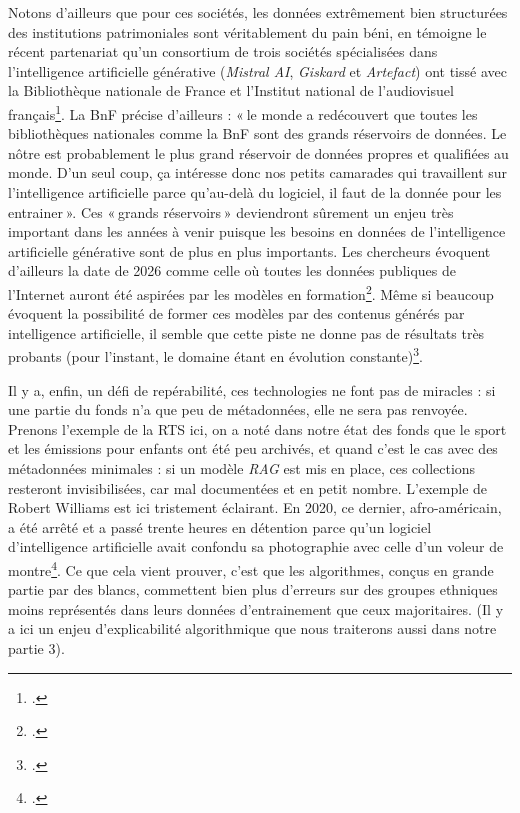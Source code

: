 Notons d’ailleurs que pour ces sociétés, les données extrêmement bien structurées des institutions patrimoniales sont véritablement du pain béni, en témoigne le récent partenariat qu’un consortium de trois sociétés spécialisées dans l’intelligence artificielle générative (\textit{Mistral AI}, \textit{Giskard} et \textit{Artefact}) ont tissé avec la Bibliothèque nationale de France et l’Institut national de l’audiovisuel français\footcite{clavey_bnf_2024}. La BnF précise d’ailleurs : « le monde a redécouvert que toutes les bibliothèques nationales comme la BnF sont des grands réservoirs de données. Le nôtre est probablement le plus grand réservoir de données propres et qualifiées au monde. D’un seul coup, ça intéresse donc nos petits camarades qui travaillent sur l’intelligence artificielle parce qu’au-delà du logiciel, il faut de la donnée pour les entrainer ». Ces « grands réservoirs » deviendront sûrement un enjeu très important dans les années à venir puisque les besoins en données de l’intelligence artificielle générative sont de plus en plus importants. Les chercheurs évoquent d’ailleurs la date de 2026 comme celle où toutes les données publiques de l’Internet auront été aspirées par les modèles en formation\footcite{forbes_internet_2024}. Même si beaucoup évoquent la possibilité de former ces modèles par des contenus générés par intelligence artificielle, il semble que cette piste ne donne pas de résultats très probants (pour l’instant, le domaine étant en évolution constante)\footcite{noauthor_entrainer_nodate}.

Il y a, enfin, un défi de repérabilité, ces technologies ne font pas de miracles : si une partie du fonds n’a que peu de métadonnées, elle ne sera pas renvoyée. Prenons l’exemple de la RTS ici, on a noté dans notre état des fonds que le sport et les émissions pour enfants ont été peu archivés, et quand c’est le cas avec des métadonnées minimales : si un modèle \textit{RAG} est mis en place, ces collections resteront invisibilisées, car mal documentées et en petit nombre. L’exemple de Robert Williams est ici tristement éclairant. En 2020, ce dernier, afro-américain, a été arrêté et a passé trente heures en détention parce qu’un logiciel d’intelligence artificielle avait confondu sa photographie avec celle d’un voleur de montre\footcite{noauthor_etats-unis_nodate}. Ce que cela vient prouver, c’est que les algorithmes, conçus en grande partie par des blancs, commettent bien plus d’erreurs sur des groupes ethniques moins représentés dans leurs données d’entrainement que ceux majoritaires. (Il y a ici un enjeu d’explicabilité algorithmique que nous traiterons aussi dans notre partie 3).

